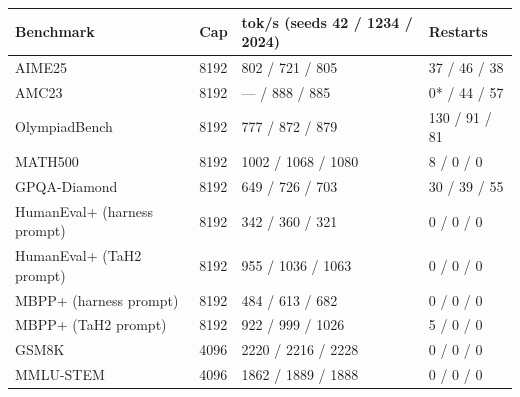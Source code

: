 \begin{tabular}{llll}
\toprule
Benchmark & Cap & tok/s (seeds 42 / 1234 / 2024) & Restarts \\
\midrule
AIME25 & 8192 & 802 / 721 / 805 & 37 / 46 / 38 \\
AMC23 & 8192 & — / 888 / 885 & 0* / 44 / 57 \\
OlympiadBench & 8192 & 777 / 872 / 879 & 130 / 91 / 81 \\
MATH500 & 8192 & 1002 / 1068 / 1080 & 8 / 0 / 0 \\
GPQA-Diamond & 8192 & 649 / 726 / 703 & 30 / 39 / 55 \\
HumanEval+ (harness prompt) & 8192 & 342 / 360 / 321 & 0 / 0 / 0 \\
HumanEval+ (TaH2 prompt) & 8192 & 955 / 1036 / 1063 & 0 / 0 / 0 \\
MBPP+ (harness prompt) & 8192 & 484 / 613 / 682 & 0 / 0 / 0 \\
MBPP+ (TaH2 prompt) & 8192 & 922 / 999 / 1026 & 5 / 0 / 0 \\
GSM8K & 4096 & 2220 / 2216 / 2228 & 0 / 0 / 0 \\
MMLU-STEM & 4096 & 1862 / 1889 / 1888 & 0 / 0 / 0 \\
\bottomrule
\end{tabular}
